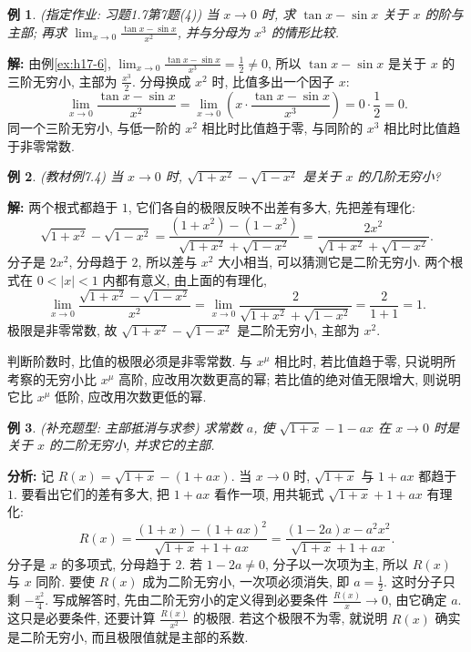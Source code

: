 \documentclass[UTF8,openany]{ctexbook}
\theoremstyle{chinesetextbook}
\newtheorem{example}{例}[section]
\newenvironment{cnsolution}{\par\indent\textbf{解:} \ignorespaces}{\par}
\begin{document}
\begin{example}
\textnormal{(指定作业: 习题1.7第7题(4))} 当 $x\to0$ 时, 求 $\tan x-\sin x$ 关于 $x$ 的阶与主部; 再求 $\displaystyle\lim_{x\to0}\frac{\tan x-\sin x}{x^2}$, 并与分母为 $x^3$ 的情形比较.
\end{example}
\begin{cnsolution}
由例\ref{ex:h17-6}, $\displaystyle\lim_{x\to0}\frac{\tan x-\sin x}{x^3}=\frac12\ne0$, 所以 $\tan x-\sin x$ 是关于 $x$ 的三阶无穷小, 主部为 $\displaystyle\frac{x^3}2$. 分母换成 $x^2$ 时, 比值多出一个因子 $x$:
\[
\lim_{x\to0}\frac{\tan x-\sin x}{x^2}=\lim_{x\to0}\left(x\cdot\frac{\tan x-\sin x}{x^3}\right)=0\cdot\frac12=0.
\]
同一个三阶无穷小, 与低一阶的 $x^2$ 相比时比值趋于零, 与同阶的 $x^3$ 相比时比值趋于非零常数.
\end{cnsolution}
\begin{example}
\textnormal{(教材例7.4)} 当 $x\to0$ 时, $\sqrt{1+x^2}-\sqrt{1-x^2}$ 是关于 $x$ 的几阶无穷小?
\end{example}
\begin{cnsolution}
两个根式都趋于 $1$, 它们各自的极限反映不出差有多大, 先把差有理化:
\[
\sqrt{1+x^2}-\sqrt{1-x^2}=\frac{(1+x^2)-(1-x^2)}{\sqrt{1+x^2}+\sqrt{1-x^2}}=\frac{2x^2}{\sqrt{1+x^2}+\sqrt{1-x^2}}.
\]
分子是 $2x^2$, 分母趋于 $2$, 所以差与 $x^2$ 大小相当, 可以猜测它是二阶无穷小. 两个根式在 $0<|x|<1$ 内都有意义, 由上面的有理化,
\[
\lim_{x\to0}\frac{\sqrt{1+x^2}-\sqrt{1-x^2}}{x^2}=\lim_{x\to0}\frac2{\sqrt{1+x^2}+\sqrt{1-x^2}}=\frac2{1+1}=1.
\]
极限是非零常数, 故 $\sqrt{1+x^2}-\sqrt{1-x^2}$ 是二阶无穷小, 主部为 $x^2$.
\end{cnsolution}
判断阶数时, 比值的极限必须是非零常数. 与 $x^\mu$ 相比时, 若比值趋于零, 只说明所考察的无穷小比 $x^\mu$ 高阶, 应改用次数更高的幂; 若比值的绝对值无限增大, 则说明它比 $x^\mu$ 低阶, 应改用次数更低的幂.
\begin{example}
\textnormal{(补充题型: 主部抵消与求参)} 求常数 $a$, 使 $\sqrt{1+x}-1-ax$ 在 $x\to0$ 时是关于 $x$ 的二阶无穷小, 并求它的主部.
\end{example}
\par\indent\textbf{分析:} 记 $R(x)=\sqrt{1+x}-(1+ax)$. 当 $x\to0$ 时, $\sqrt{1+x}$ 与 $1+ax$ 都趋于 $1$. 要看出它们的差有多大, 把 $1+ax$ 看作一项, 用共轭式 $\sqrt{1+x}+1+ax$ 有理化:
\[
R(x)=\frac{(1+x)-(1+ax)^2}{\sqrt{1+x}+1+ax}=\frac{(1-2a)x-a^2x^2}{\sqrt{1+x}+1+ax}.
\]
分子是 $x$ 的多项式, 分母趋于 $2$. 若 $1-2a\ne0$, 分子以一次项为主, 所以 $R(x)$ 与 $x$ 同阶. 要使 $R(x)$ 成为二阶无穷小, 一次项必须消失, 即 $\displaystyle a=\frac12$. 这时分子只剩 $\displaystyle-\frac{x^2}4$. 写成解答时, 先由二阶无穷小的定义得到必要条件 $\displaystyle\frac{R(x)}x\to0$, 由它确定 $a$. 这只是必要条件, 还要计算 $\displaystyle\frac{R(x)}{x^2}$ 的极限. 若这个极限不为零, 就说明 $R(x)$ 确实是二阶无穷小, 而且极限值就是主部的系数.
\end{document}
